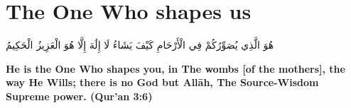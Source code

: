 \chapter{The One Who shapes us}
\begin{center}
    {\Huge    
        \begin{Arabic}
            هُوَ الَّذِي يُصَوِّرُكُمْ فِي الْأَرْحَامِ كَيْفَ يَشَاءُ لَا إِلَٰهَ إِلَّا هُوَ الْعَزِيزُ الْحَكِيمُ
        \end{Arabic}
    }    
\end{center}
\vspace*{\fill}
\vspace{3cm}
\begin{center}
    \large \textbf{He is the One Who shapes you, in The wombs [of the mothers], the way He Wills; there is no God but Allāh, The Source-Wisdom Supreme power. (Qur'an 3:6)}
\end{center}
